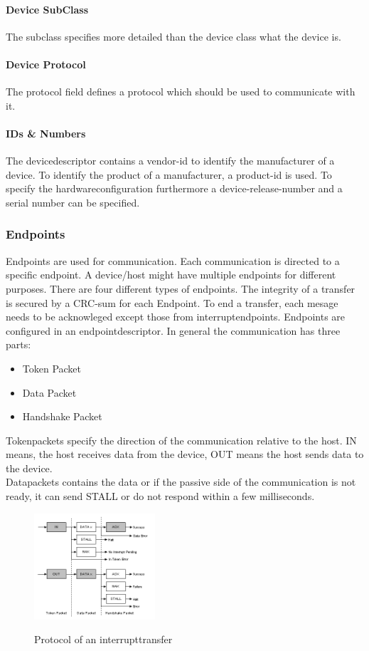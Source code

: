 \documentclass{acm_proc_article-sp}
\begin{document}
\paragraph{Device SubClass}
The subclass specifies more detailed than the device class what the device is. \cite{beyond} \cite{usborg}
\paragraph{Device Protocol}
The protocol field defines a protocol which should be used to communicate with it. \cite{beyond} \cite{usborg}
\paragraph{IDs \& Numbers}
The devicedescriptor contains a vendor-id to identify the manufacturer of a device.
To identify the product of a manufacturer, a product-id is used. To specify the hardwareconfiguration furthermore a device-release-number and a serial number can be specified. \cite{beyond} \cite{usborg}

\subsubsection{Endpoints}
Endpoints are used for communication. Each communication is directed to a specific endpoint. A device/host might have multiple endpoints for different purposes. There are four different types of endpoints. The integrity of a transfer is secured by a CRC-sum for each Endpoint. To end a transfer, each mesage needs to be acknowleged except those from interruptendpoints. Endpoints are configured in an endpointdescriptor. In general the communication has three parts: \cite{beyond}
\begin{itemize}
\item Token Packet
\item Data Packet
\item Handshake Packet
\end{itemize}
Tokenpackets specify the direction of the communication relative to the host. IN means, the host receives data from the device, OUT means the host sends data to the device.\\
Datapackets contains the data or if the passive side of the communication is not ready, it can send STALL or do not respond within a few milliseconds. \cite{beyond}
\begin{figure}
\centering
\includegraphics[width=0.4\textwidth]{interrupttransfer.png}
\label{fig:interrupttransfer}
\caption{Protocol of an interrupttransfer \cite{beyond}}
\end{figure}
\end{document}
